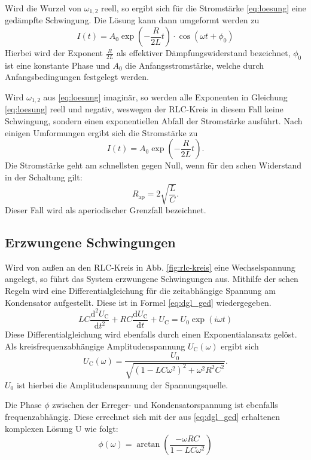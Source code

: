 Wird die Wurzel von $\omega_{1,2}$ reell, so ergibt sich für die Stromstärke \eqref{eq:loesung} eine gedämpfte Schwingung. Die Lösung kann dann umgeformt werden zu
\begin{equation}
\label{eq:loesung_ged}
I(t) = A_0 \exp\left({-\frac{R}{2L}t}\right) \cdot \cos({\omega t + \phi_0})
\end{equation}
Hierbei wird der Exponent $\frac{R}{2L}$ als effektiver Dämpfungswiderstand bezeichnet, $\phi_0$ ist eine konstante Phase und $A_0$ die Anfangsstromstärke, welche durch Anfangsbedingungen festgelegt werden.

Wird $\omega_{1,2}$ aus \eqref{eq:loesung} imaginär, so werden alle Exponenten in Gleichung \eqref{eq:loesung} reell und negativ, weswegen der RLC-Kreis in diesem Fall keine Schwingung, sondern einen exponentiellen Abfall der Stromstärke ausführt.
Nach einigen Umformungen ergibt sich die Stromstärke zu
\begin{equation}
\label{eq:loesung_ged_reell}
I(t) = A_0 \exp\left({-\frac{R}{2L}t}\right).
\end{equation}
Die Stromstärke geht am schnellsten gegen Null, wenn für den schen Widerstand in der Schaltung gilt:
\begin{equation}
\label{eq:rap}
R_{\text{ap}} = 2\sqrt{\frac{L}{C}}.
\end{equation}
Dieser Fall wird als aperiodischer Grenzfall bezeichnet.

\subsection{Erzwungene Schwingungen}
Wird von außen an den RLC-Kreis in Abb. \ref{fig:rlc-kreis} eine Wechselspannung angelegt, so führt das System erzwungene Schwingungen aus.
Mithilfe der schen Regeln wird eine Differentialgleichung für die zeitabhängige Spannung am Kondensator aufgestellt. Diese ist in Formel \eqref{eq:dgl_ged} wiedergegeben.
\begin{equation}
\label{eq:dgl_ged}
LC \frac{\text{d}^2 U_\text{C}}{\text{d}t^2} + RC \frac{\text{d}U_\text{C}}{\text{d}t} + U_\text{C} = U_0 \exp({i\omega t})
\end{equation}
Diese Differentialgleichung wird ebenfalls durch einen Exponentialansatz gelöst. Als kreisfrequenzabhängige Amplitudenspannung $U_\text{C}(\omega)$ ergibt sich
\begin{equation}
\label{eq:amplitude_freq}
U_\text{C}(\omega) = \frac{U_0}{ \sqrt{ (1 - LC \omega^2)^2 + \omega^2 R^2 C^2  }}.
\end{equation}
$U_0$ ist hierbei die Amplitudenspannung der Spannungsquelle.

Die Phase $\phi$ zwischen der Erreger- und Kondensatorspannung ist ebenfalls frequenzabhängig. Diese errechnet sich mit der aus \eqref{eq:dgl_ged} erhaltenen komplexen Lösung U wie folgt:
\begin{equation}
\label{eq:phase_freq}
\phi(\omega) = \arctan{\left(\frac{-\omega R C}{1 - LC \omega^2}\right)}
\end{equation}
